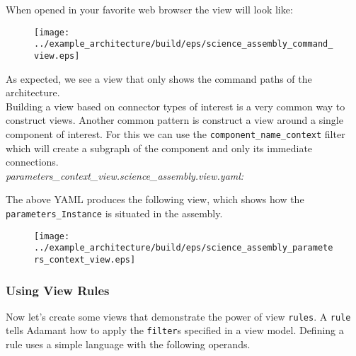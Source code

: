 When opened in your favorite web browser the view will look like:

\begin{figure}[H]
  \texttt{[image: ../example\_architecture/build/eps/science\_assembly\_command\_view.eps]}
\end{figure}

As expected, we see a view that only shows the command paths of the architecture. \\

Building a view based on connector types of interest is a very common way to construct views. Another common pattern is construct a view around a single component of interest. For this we can use the \texttt{component\_name\_context} filter which will create a subgraph of the component and only its immediate connections. \\

\textit{parameters\_context\_view.science\_assembly.view.yaml:}

The above YAML produces the following view, which shows how the \texttt{parameters\_Instance} is situated in the assembly.

\begin{figure}[H]
  \texttt{[image: ../example\_architecture/build/eps/science\_assembly\_parameters\_context\_view.eps]}
\end{figure}

\subsubsection{Using View Rules} \label{Using View Rules}

Now let's create some views that demonstrate the power of view \texttt{rules}. A \texttt{rule} tells Adamant how to apply the \texttt{filter}s specified in a view model. Defining a rule uses a simple language with the following operands.

